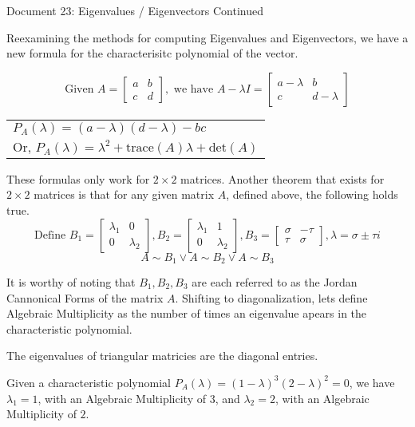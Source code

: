 \documentclass[11pt]{article}
\begin{document}
\begin{center}
Document 23: Eigenvalues / Eigenvectors Continued
\end{center}

Reexamining the methods for computing Eigenvalues and Eigenvectors, we have a new formula for the characterisitc polynomial of the vector.

$$\text{Given }A=\begin{bmatrix}a & b\\c & d\end{bmatrix}, \text{ we have } A-\lambda I=\begin{bmatrix}a-\lambda & b\\c & d-\lambda\end{bmatrix}$$
\begin{center}\begin{tabular}{l}
$P_A(\lambda)=(a-\lambda)(d-\lambda)-bc$\\
$\text{Or, }P_A(\lambda)=\lambda ^2+\text{trace}(A)\lambda+\text{det}(A)$
\end{tabular}\end{center}

These formulas only work for $2\times 2$ matrices. Another theorem that exists for $2\times 2$ matrices is that for any given matrix $A$, defined above, the following holds true.
$$\text{Define } B_1=\begin{bmatrix}\lambda _1 & 0\\0 & \lambda _2\end{bmatrix}, 
B_2=\begin{bmatrix}\lambda _1 & 1\\0 & \lambda _2\end{bmatrix}, 
B_3=\begin{bmatrix}\sigma & -\tau\\\tau & \sigma\end{bmatrix},\lambda =\sigma\pm\tau i$$
$$A\sim B_1\vee A\sim B_2 \vee A\sim B_3$$

It is worthy of noting that $B_1, B_2, B_3$ are each referred to as the Jordan Cannonical Forms of the matrix $A$. Shifting to diagonalization, lets define Algebraic Multiplicity as the number of times an eigenvalue apears in the characteristic polynomial.

The eigenvalues of triangular matricies are the diagonal entries.

Given a characteristic polynomial $P_A(\lambda)=(1-\lambda)^3(2-\lambda)^2=0$, we have $\lambda _1=1$, with an Algebraic Multiplicity of $3$, and $\lambda _2=2$, with an Algebraic Multiplicity of $2$.\\
\end{document}
